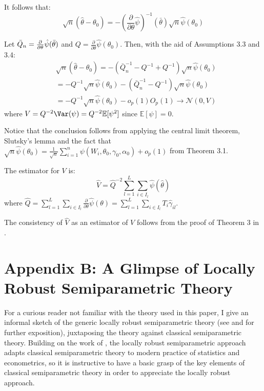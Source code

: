  It follows that:
 \[
\sqrt{n}(\hat{\theta}-\theta_0)=-(\frac{\partial}{\partial{\theta}}\hat{\psi})^{-1}(\bar{\theta})\sqrt{n}\hat{\psi}(\theta_0) \]

Let $\Bar{Q}_n=\frac{\partial}{\partial \theta}\hat{\psi}(\Bar{\theta})$ and $Q=\frac{\partial}{\partial \theta}\hat{\psi}(\theta_0)$. Then, with the aid of Assumptions 3.3 and 3.4:
\begin{align*}
    &\sqrt{n}(\hat{\theta}-\theta_0)=-(\bar{Q}^{-1}_n-Q^{-1}+Q^{-1})\sqrt{n}\hat{\psi}(\theta_0)\\
    &= -Q^{-1}\sqrt{n}\hat{\psi}(\theta_0)-(\bar{Q}^{-1}_n-Q^{-1})\sqrt{n}\hat{\psi}(\theta_0)\\
    &= -Q^{-1}\sqrt{n}\hat{\psi}(\theta_0)-o_p(1)O_p(1) \to \mathcal{N}(0,V)
\end{align*}
where $V=Q^{-2} \Var(\psi)=Q^{-2}\mathbb{E}[\psi^2]$ since $\mathbb{E}[\psi]=0$.

Notice that the conclusion follows from applying the central limit theorem, Slutsky's lemma and the fact that $\sqrt{n} \hat{\psi}\left(\theta_0\right)=\frac{1}{\sqrt{n}} \sum_{i=1}^n \psi\left(W_i, \theta_0, \gamma_0, \alpha_0\right)+o_p(1)$ from Theorem 3.1.

The estimator for $V$ is:
\[\hat{V}=\widehat{Q}^{-2} \sum_{l=1}^L \sum_{i \in I_{l}} \hat{\psi}(\hat{\theta})\]
where $\widehat{Q}=\sum_{l=1}^L \sum_{i \in I_{l}} \frac{\partial}{\partial{\theta}}\hat{\psi}(\theta)=\sum_{l=1}^L \sum_{i \in I_{l}}T_i \hat{\gamma}_{i l}$.

The consistency of $\hat{V}$ as an estimator of $V$ follows from the proof of Theorem 3 in \citet{chernozhukov2022automatic}.

\section{Appendix B: A Glimpse of Locally Robust Semiparametric Theory}

For a curious reader not familiar with the theory used in this paper, I give an informal sketch of the generic locally robust semiparametric theory (see \citet{chernozhukov2022locally} and \citet{ichimura2022influence} for further exposition), juxtaposing the theory against classical semiparametric theory. Building on the work of \citet{newey1994asymptotic}, the locally robust semiparametric approach adapts classical semiparametric theory to modern practice of statistics and econometrics, so it is instructive to have a basic grasp of the key elements of classical semiparametric theory in order to appreciate the locally robust approach. 

